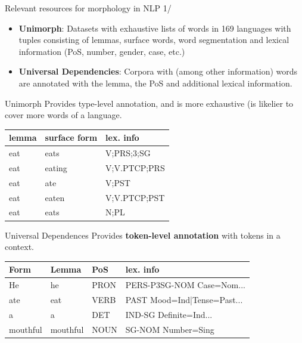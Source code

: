 \documentclass{beamer}
\begin{document}
\begin{frame}{Relevant resources for morphology in NLP 1/}
    \begin{itemize}
        \item \textbf{Unimorph}: Datasets with exhaustive lists of words in 169 languages with tuples consisting of lemmas, surface words, word segmentation and lexical information (PoS, number, gender, case, etc.)
        \item \textbf{Universal Dependencies}: Corpora with (among other information) words are annotated with the lemma, the PoS and additional lexical information.
    \end{itemize}
\end{frame}

\begin{frame}{Unimorph}
    Provides type-level annotation, and is more exhaustive (is likelier to cover more words of a language.

    \begin{center}
        
    \begin{tabular}{l|l|l}
      \textbf{lemma} & \textbf{surface form} & \textbf{lex. info} \\ \hline
      eat	  & eats         & V;PRS;3;SG \\
      eat   & eating       & V;V.PTCP;PRS \\
      eat   & ate          & V;PST \\
      eat   & eaten        & V;V.PTCP;PST \\
      eat   & eats         & N;PL
    \end{tabular}
    \end{center}
\end{frame}

\begin{frame}{Universal Dependences}
    Provides \textbf{token-level annotation} with tokens in a context.

    \begin{center}
        
   \begin{tabular}{l|l|l|l}
Form       & Lemma     & PoS & lex. info   \\
\hline
He         & he        & PRON & PERS-P3SG-NOM  Case=Nom... \\
ate        & eat       & VERB & PAST           Mood=Ind|Tense=Past... \\
a          & a         & DET  & IND-SG         Definite=Ind... \\
mouthful   & mouthful  & NOUN & SG-NOM        Number=Sing     \\
\end{tabular}
    \end{center}
\end{frame}
\end{document}
